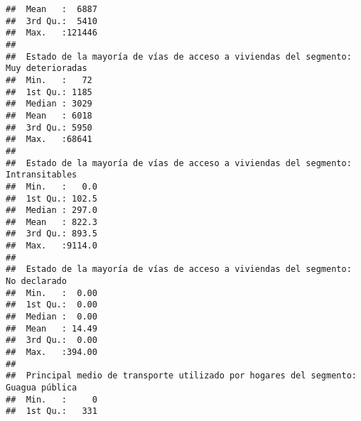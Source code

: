 \documentclass[11pt,]{article}
\begin{document}
\begin{verbatim}
##  Mean   :  6887                                                                    
##  3rd Qu.:  5410                                                                    
##  Max.   :121446                                                                    
##                                                                                    
##  Estado de la mayoría de vías de acceso a viviendas del segmento: Muy deterioradas
##  Min.   :   72                                                                    
##  1st Qu.: 1185                                                                    
##  Median : 3029                                                                    
##  Mean   : 6018                                                                    
##  3rd Qu.: 5950                                                                    
##  Max.   :68641                                                                    
##                                                                                   
##  Estado de la mayoría de vías de acceso a viviendas del segmento: Intransitables
##  Min.   :   0.0                                                                 
##  1st Qu.: 102.5                                                                 
##  Median : 297.0                                                                 
##  Mean   : 822.3                                                                 
##  3rd Qu.: 893.5                                                                 
##  Max.   :9114.0                                                                 
##                                                                                 
##  Estado de la mayoría de vías de acceso a viviendas del segmento: No declarado
##  Min.   :  0.00                                                               
##  1st Qu.:  0.00                                                               
##  Median :  0.00                                                               
##  Mean   : 14.49                                                               
##  3rd Qu.:  0.00                                                               
##  Max.   :394.00                                                               
##                                                                               
##  Principal medio de transporte utilizado por hogares del segmento: Guagua pública
##  Min.   :     0                                                                  
##  1st Qu.:   331                                                                  

\end{verbatim}
\end{document}
